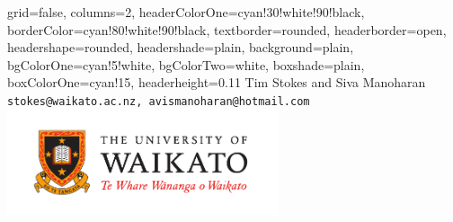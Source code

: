 \documentclass[landscape,a1paper,fontscale=0.48,final]{baposter}
\begin{document}
\begin{poster}{
 grid=false,
 columns=2,
 headerColorOne=cyan!30!white!90!black,
 borderColor=cyan!80!white!90!black,
 textborder=rounded,
 headerborder=open,
 headershape=rounded,
 headershade=plain,
 background=plain,
 bgColorOne=cyan!5!white,
 bgColorTwo=white,
 boxshade=plain,
 boxColorOne=cyan!15,
 headerheight=0.11\textheight}
 {}
 {}
 {Tim Stokes and Siva Manoharan\\[1em]
 {\texttt{stokes@waikato.ac.nz, avismanoharan@hotmail.com}}}
  {%
    \includegraphics[width=8cm]{crest.pdf}
  }


\end{poster}
\end{document}
